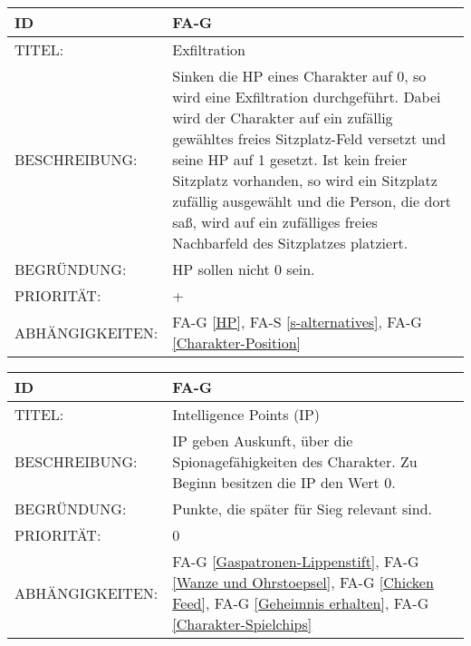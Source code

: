 \begin{tabularx}{16cm}{l|X}
	{table}\label{Exfiltration}
	\textbf{ID} & \textbf{FA-G \arabic{table}} \\
	\hline
	TITEL: & Exfiltration \\
	\hline
	BESCHREIBUNG: & Sinken die HP eines Charakter auf 0, so wird eine Exfiltration durchgeführt. Dabei wird der Charakter auf ein zufällig gewähltes freies Sitzplatz-Feld versetzt und seine HP auf 1 gesetzt. Ist kein freier Sitzplatz vorhanden, so wird ein Sitzplatz zufällig ausgewählt und die Person, die dort saß, wird auf ein zufälliges freies Nachbarfeld des Sitzplatzes platziert.\\
	\hline
	BEGRÜNDUNG: & HP sollen nicht 0 sein.\\
	\hline
	PRIORITÄT: & +\\
	\hline
	ABHÄNGIGKEITEN: & FA-G \ref{HP}, FA-S \ref{s-alternatives}, FA-G \ref{Charakter-Position}\\
\end{tabularx}

\begin{tabularx}{16cm}{l|X}
	{table}\label{IP}
	\textbf{ID} & \textbf{FA-G \arabic{table}} \\
	\hline
	TITEL: & Intelligence Points (IP) \\
	\hline
	BESCHREIBUNG: & IP geben Auskunft, über die Spionagefähigkeiten des Charakter. Zu Beginn besitzen die IP den Wert 0.\\
	\hline
	BEGRÜNDUNG: & Punkte, die später für Sieg relevant sind.\\
	\hline
	PRIORITÄT: & 0\\
	\hline
	ABHÄNGIGKEITEN: & FA-G \ref{Gaspatronen-Lippenstift}, FA-G \ref{Wanze und Ohrstoepsel}, FA-G \ref{Chicken Feed}, FA-G \ref{Geheimnis erhalten}, FA-G \ref{Charakter-Spielchips} \\
\end{tabularx}


